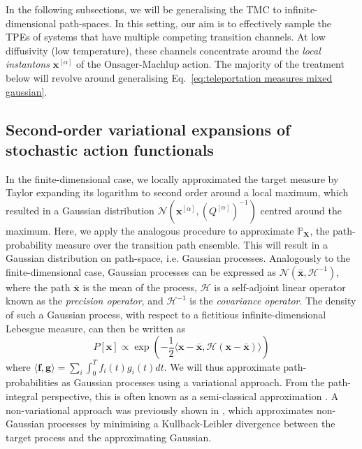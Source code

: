 In the following subsections, we will be generalising the TMC to infinite-dimensional path-spaces. In this setting, our aim is to effectively sample the TPEs of systems that have multiple competing transition channels. At low diffusivity (low temperature), these channels concentrate around the \textit{local instantons} $\mathbf{x}^{[\alpha]}$ of the Onsager-Machlup action. The majority of the treatment below will revolve around generalising Eq.~\ref{eq:teleportation measures mixed gaussian}.

\subsection{Second-order variational expansions of stochastic action functionals} \label{sec:Second-order variational expansions of stochastic action functionals}

In the finite-dimensional case, we locally approximated the target measure by Taylor expanding its logarithm to second order around a local maximum, which resulted in a Gaussian distribution $\mathcal{N}(\mathbf{x}^{[\alpha]}, (Q^{[\alpha]})^{-1})$ centred around the maximum. Here, we apply the analogous procedure to approximate $\mathbb{P}_\mathbf{X}$, the path-probability measure over the transition path ensemble. This will result in a Gaussian distribution on path-space, i.e. Gaussian processes. Analogously to the finite-dimensional case, Gaussian processes can be expressed as $\mathcal{N}(\bar{\mathbf{x}}, \mathcal{H}^{-1})$, where the path $\bar{\mathbf{x}}$ is the mean of the process, $\mathcal{H}$ is a self-adjoint linear operator known as the \textit{precision operator}, and $\mathcal{H}^{-1}$ is the \textit{covariance operator}. The density of such a Gaussian process, with respect to a fictitious infinite-dimensional Lebesgue measure, can then be written as
\begin{equation} \label{eq:Gaussian path density}
P[\mathbf{x}] \propto \exp \left( - \frac{1}{2} \langle \mathbf{x}-\bar{\mathbf{x}}, \mathcal{H} (\mathbf{x}-\bar{\mathbf{x}}) \rangle \right)	
\end{equation}
where $\langle \mathbf{f},\mathbf{g}\rangle=\sum_{i}\int_{0}^{T}f_{i}(t)g_{i}(t)dt$. We will thus approximate path-probabilities as Gaussian processes using a variational approach. From the path-integral perspective, this is often known as a semi-classical approximation \citep{chaichianPathIntegralsPhysics2001, schulmanTechniquesApplicationsPath1996, smirnovEstimationPathIntegral2010, moretteDefinitionApproximationFeynman1951, marinovPathIntegralsQuantum1980, sakuraiModernQuantumMechanics2017}. A non-variational approach was previously shown in \cite{luGaussianApproximationsTransition2017a}, which approximates non-Gaussian processes by minimising a Kullback-Leibler divergence between the target process and the approximating Gaussian.

